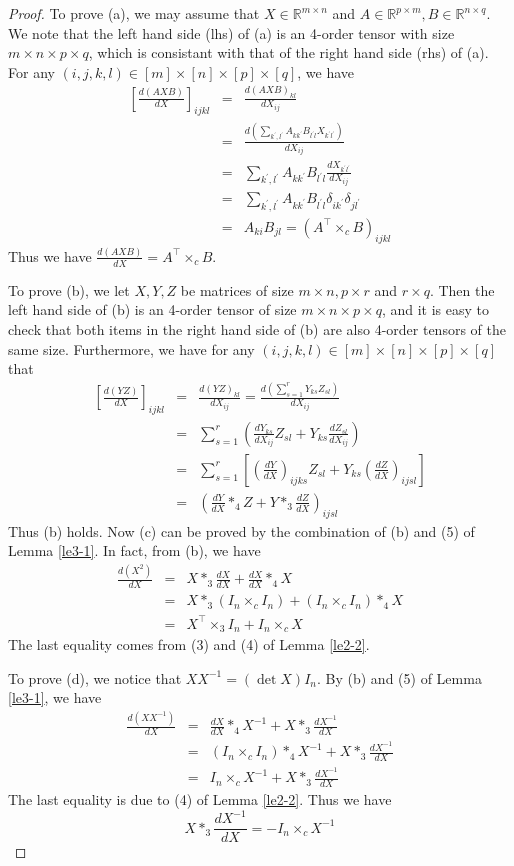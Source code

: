 \documentclass[11pt, oneside]{article}  %
\newcommand{\p}{\prime}
\newcommand{\RR}{\mathbb{R}}
\newcommand{\beq}{\begin{equation}}
\newcommand{\eeq}{\end{equation}}
\newcommand{\beyy}{\begin{eqnarray*}}
\newcommand{\eeyy}{\end{eqnarray*}}
\begin{document}
\begin{proof}
To prove (a), we may assume that $X\in\RR^{m\times n}$ and $A\in\RR^{p\times m}, B\in\RR^{n\times q}$.  We note that the left hand side (lhs) of (a) is an 4-order tensor with size $m\times n\times p\times q$, which is consistant with that of the right hand side (rhs) of (a). For any 
$(i,j,k,l)\in [m]\times [n]\times [p]\times [q]$, we have 
\beyy 
\left[\frac{d (AXB)}{d X}\right]_{ijkl} 
&=&\frac{d (AXB)_{kl}}{d X_{ij}}\\
&=&\frac{d (\sum_{k^{\p},l^{\p}}A_{kk^{\p}}B_{l^{\p}l}X_{k^{\p}l^{\p}})}{d X_{ij}}\\    
&=&\sum_{k^{\p},l^{\p}}A_{kk^{\p}}B_{l^{\p}l} \frac{d X_{k^{\p}l^{\p}}}{d X_{ij}}\\ 
&=&\sum_{k^{\p},l^{\p}}A_{kk^{\p}}B_{l^{\p}l} \delta_{i k^{\p}}\delta_{j l^{\p}}\\ 
&=&A_{ki}B_{jl} = \left( A^{\top}\times_{c} B\right)_{ijkl}
\eeyy
Thus we have $\frac{d (AXB)}{d X}=A^{\top}\times_{c} B$. \par 
\indent To prove (b), we let $X,Y,Z$ be matrices of size $m\times n, p\times r$ and $r\times q$.  Then the left hand side of (b) is an 4-order tensor of size 
$m\times n\times p\times q$, and it is easy to check that both items in the right hand side of (b) are also 4-order tensors of the same size. Furthermore, 
we have for any $(i,j,k,l)\in [m]\times [n]\times [p]\times [q]$ that  
\beyy 
\left[\frac{d (YZ)}{d X}\right]_{ijkl}&=&\frac{d (YZ)_{kl}}{d X_{ij}}=\frac{d (\sum_{s=1}^{r}Y_{ks}Z_{sl})}{d X_{ij}}\\    
&=&\sum_{s=1}^{r}\left( \frac{d Y_{ks}}{d X_{ij}} Z_{sl} + Y_{ks} \frac{d Z_{sl}}{d X_{ij}}\right) \\ 
&=&\sum_{s=1}^{r}\left[ \left(\frac{d Y}{d X}\right)_{ijks} Z_{sl} + Y_{ks}\left(\frac{d Z}{d X}\right)_{ijsl}\right] \\ 
&=&\left( \frac{dY}{dX}\ast_{4}Z +Y\ast_{3}\frac{dZ}{dX}\right)_{ijsl}
\eeyy 
Thus (b) holds.  Now (c) can be proved by the combination of (b) and (5) of Lemma \ref{le3-1}. In fact, from (b), we have 
 \beyy 
\frac{d (X^{2})}{d X}
& = &X\ast_{3}\frac{dX}{d X} + \frac{dX}{dX}\ast_{4} X \\
& = &X\ast_{3}(I_{n}\times_{c} I_{n}) + (I_{n}\times_{c} I_{n}) \ast_{4} X \\ 
& = &X^{\top}\times_{3} I_{n} + I_{n}\times_{c} X     
\eeyy
The last equality comes from (3) and (4) of  Lemma \ref{le2-2}. \par
\indent To prove (d), we notice that $XX^{-1} = (\det X) I_{n}$.  By (b) and (5) of Lemma \ref{le3-1}, we have 
\beyy
\frac{d(XX^{-1})}{dX} 
&=& \frac{dX}{dX}\ast_{4} X^{-1} + X\ast_{3}\frac{d X^{-1}}{dX}\\
&=& (I_{n}\times_{c} I_{n}) \ast_{4} X^{-1} + X\ast_{3} \frac{d X^{-1}}{dX}\\
&=& I_{n}\times_{c} X^{-1} + X\ast_{3} \frac{d X^{-1}}{dX}
\eeyy
The last equality is due to (4) of Lemma \ref{le2-2}.  Thus we have 
\beq\label{eq:le3-2-1}
X\ast_{3} \frac{d X^{-1}}{dX} = - I_{n}\times_{c} X^{-1} 
\eeq
\end{proof}
\end{document}

